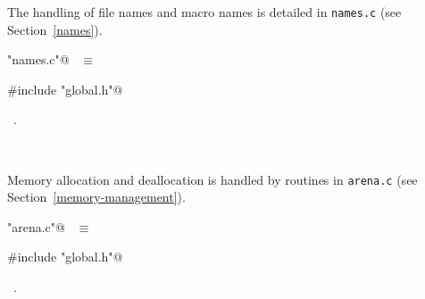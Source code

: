 \documentclass{report}
\begin{document}
The handling of file names and macro names is detailed in \verb|names.c|
(see Section~\ref{names}).
\begin{flushleft} \small
\begin{minipage}{\linewidth} \label{scrap11}
\verb@"names.c"@\nobreak\ {\footnotesize {} }$\equiv$
\vspace{-1ex}
\begin{list}{}{} \item
\mbox{}\verb@#include "global.h"@\\
\mbox{}\verb@@{\NWsep}
\end{list}
\vspace{-1ex}
\footnotesize\addtolength{\baselineskip}{-1ex}
\begin{list}{}{\setlength{\itemsep}{-\parsep}\setlength{\itemindent}{-\leftmargin}}
\item \NWtxtFileDefBy\ .
\end{list}
\end{minipage}\\[4ex]
\end{flushleft}
Memory allocation and deallocation is handled by routines in \verb|arena.c|
(see Section~\ref{memory-management}).
\begin{flushleft} \small
\begin{minipage}{\linewidth} \label{scrap12}
\verb@"arena.c"@\nobreak\ {\footnotesize {} }$\equiv$
\vspace{-1ex}
\begin{list}{}{} \item
\mbox{}\verb@#include "global.h"@\\
\mbox{}\verb@@{\NWsep}
\end{list}
\vspace{-1ex}
\footnotesize\addtolength{\baselineskip}{-1ex}
\begin{list}{}{\setlength{\itemsep}{-\parsep}\setlength{\itemindent}{-\leftmargin}}
\item \NWtxtFileDefBy\ .
\end{list}
\end{minipage}\\[4ex]
\end{flushleft}
\end{document}
